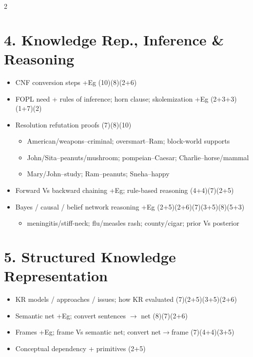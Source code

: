\documentclass[10pt]{article}
\begin{document}
\begin{multicols}{2}
\section*{4. Knowledge Rep., Inference \& Reasoning}
\begin{itemize}
  \item CNF conversion steps +Eg \hfill (10)(8)(2+6)
  \item FOPL need + rules of inference; horn clause; skolemization +Eg \hfill (2+3+3)(1+7)(2)
  \item Resolution refutation proofs \hfill (7)(8)(10)
    \begin{itemize}
      \item American/weapons--criminal; oversmart--Ram; block-world supports
      \item John/Sita--peanuts/mushroom; pompeian--Caesar; Charlie--horse/mammal
      \item Mary/John--study; Ram--peanuts; Sneha--happy
    \end{itemize}
  \item Forward Vs backward chaining +Eg; rule-based reasoning \hfill (4+4)(7)(2+5)
  \item Bayes / causal / belief network reasoning +Eg \hfill (2+5)(2+6)(7)(3+5)(8)(5+3)
    \begin{itemize}
      \item meningitis/stiff-neck; flu/measles rash; county/cigar; prior Vs posterior
    \end{itemize}
\end{itemize}

\section*{5. Structured Knowledge Representation}
\begin{itemize}
  \item KR models / approaches / issues; how KR evaluated \hfill (7)(2+5)(3+5)(2+6)
  \item Semantic net +Eg; convert sentences $\to$ net \hfill (8)(7)(2+6)
  \item Frames +Eg; frame Vs semantic net; convert net$\to$frame \hfill (7)(4+4)(3+5)
  \item Conceptual dependency + primitives \hfill (2+5)
\end{itemize}


\end{multicols}
\end{document}
